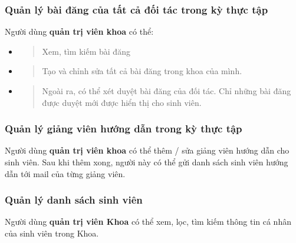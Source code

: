 \documentclass[./../main.tex]{subfiles}
\begin{document}
  \hypertarget{quux1ea3n-luxfd-buxe0i-ux111ux103ng-cux1ee7a-tux1ea5t-cux1ea3-ux111ux1ed1i-tuxe1c-trong-kux1ef3-thux1ef1c-tux1eadp}{%
  \subsubsection{Quản lý bài đăng của tất cả đối tác trong kỳ thực
  tập}\label{quux1ea3n-luxfd-buxe0i-ux111ux103ng-cux1ee7a-tux1ea5t-cux1ea3-ux111ux1ed1i-tuxe1c-trong-kux1ef3-thux1ef1c-tux1eadp}}
  
  Người dùng \textbf{quản trị viên khoa} có thể:
  
  \begin{itemize}
  \item
    \begin{quote}
    Xem, tìm kiếm bài đăng
    \end{quote}
  \item
    \begin{quote}
    Tạo và chỉnh sửa tất cả bài đăng trong khoa của mình.
    \end{quote}
  \item
    \begin{quote}
    Ngoài ra, có thể xét duyệt bài đăng của đối tác. Chỉ những bài đăng
    được duyệt mới được hiển thị cho sinh viên.
    \end{quote}
  \end{itemize}
  
  \hypertarget{quux1ea3n-luxfd-giux1ea3ng-viuxean-hux1b0ux1edbng-dux1eabn-trong-kux1ef3-thux1ef1c-tux1eadp}{%
  \subsubsection{Quản lý giảng viên hướng dẫn trong kỳ thực
  tập}\label{quux1ea3n-luxfd-giux1ea3ng-viuxean-hux1b0ux1edbng-dux1eabn-trong-kux1ef3-thux1ef1c-tux1eadp}}
  
  Người dùng \textbf{quản trị viên khoa} có thể thêm / sửa giảng viên
  hướng dẫn cho sinh viên. Sau khi thêm xong, người này có thể gửi danh
  sách sinh viên hướng dẫn tới mail của từng giảng viên.
  
  \hypertarget{quux1ea3n-luxfd-danh-suxe1ch-sinh-viuxean}{%
  \subsubsection{Quản lý danh sách sinh
  viên}\label{quux1ea3n-luxfd-danh-suxe1ch-sinh-viuxean}}
  
  Người dùng \textbf{quản trị viên Khoa} có thể xem, lọc, tìm kiếm thông
  tin cá nhân của sinh viên trong Khoa.
  
\end{document}
